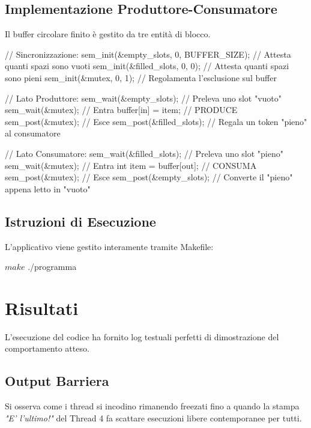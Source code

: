 \documentclass[a4paper,12pt]{article}
\begin{document}
\subsection{Implementazione Produttore-Consumatore}
Il buffer circolare finito è gestito da tre entità di blocco.
\begin{ccode}
// Sincronizzazione:
sem_init(&empty_slots, 0, BUFFER_SIZE);  // Attesta quanti spazi sono vuoti
sem_init(&filled_slots, 0, 0);           // Attesta quanti spazi sono pieni
sem_init(&mutex, 0, 1);                  // Regolamenta l'esclusione sul buffer

// Lato Produttore:
sem_wait(&empty_slots);  // Preleva uno slot "vuoto"
sem_wait(&mutex);        // Entra
buffer[in] = item;       // PRODUCE
sem_post(&mutex);        // Esce
sem_post(&filled_slots); // Regala un token "pieno" al consumatore

// Lato Consumatore:
sem_wait(&filled_slots); // Preleva uno slot "pieno"
sem_wait(&mutex);        // Entra
int item = buffer[out];  // CONSUMA
sem_post(&mutex);        // Esce
sem_post(&empty_slots);  // Converte il "pieno" appena letto in "vuoto"
\end{ccode}


\subsection{Istruzioni di Esecuzione}
L'applicativo viene gestito interamente tramite Makefile:
\begin{terminal}
$ make
$ ./programma
\end{terminal}

\section{Risultati}
L'esecuzione del codice ha fornito log testuali perfetti di dimostrazione del comportamento atteso.

\subsection{Output Barriera}
Si osserva come i thread si incodino rimanendo freezati fino a quando la stampa \textit{"E' l'ultimo!"} del Thread 4 fa scattare esecuzioni libere contemporanee per tutti.
\end{document}
